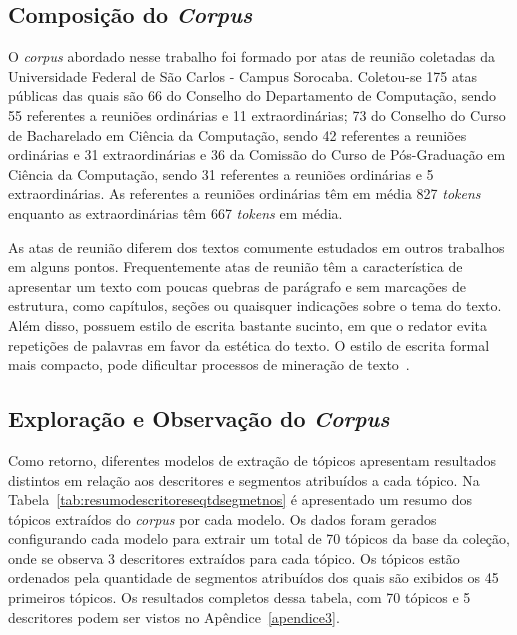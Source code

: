 \subsection{Composição do \textit{Corpus} }
\label{subsec:composicaocorpus}

O \textit{corpus} abordado nesse trabalho foi formado por atas de reunião coletadas da Universidade Federal de São Carlos - Campus Sorocaba. 
Coletou-se 175 atas públicas
das quais são 
66 do Conselho do Departamento de Computação, sendo 55 referentes a reuniões ordinárias e 11 extraordinárias;
73 do Conselho do Curso de Bacharelado em Ciência da Computação, sendo 42 referentes a reuniões ordinárias e 31 extraordinárias e
36 da Comissão do Curso de Pós-Graduação em Ciência da Computação, sendo 31 referentes a reuniões ordinárias e 5 extraordinárias.
As referentes a reuniões ordinárias têm em média 827 \textit{tokens} enquanto as extraordinárias têm 667 \textit{tokens} em média.

As atas de reunião diferem dos textos comumente estudados em outros trabalhos em alguns pontos. Frequentemente atas de reunião têm a característica de apresentar um texto com poucas quebras de parágrafo e sem marcações de estrutura, como capítulos, seções ou quaisquer indicações sobre o tema do texto. Além disso, possuem estilo de escrita bastante sucinto, em que o redator evita repetições de palavras em favor da estética do texto. O estilo de escrita formal mais compacto, pode dificultar processos de mineração de texto~\cite{Choi2001-LSA}.  %








\subsection{Exploração e Observação do \textit{Corpus}}

Como retorno, diferentes modelos de extração de tópicos apresentam resultados distintos em relação aos descritores e segmentos atribuídos a cada tópico. Na Tabela~\ref{tab:resumodescritoreseqtdsegmetnos} é apresentado um resumo dos tópicos extraídos do \textit{corpus} por cada modelo. Os dados foram gerados configurando cada modelo para extrair um total de 70 tópicos da base da coleção, onde se observa 3 descritores extraídos para cada tópico. Os tópicos estão ordenados pela quantidade de segmentos atribuídos dos quais são exibidos os 45 primeiros tópicos. Os resultados completos dessa tabela, com 70 tópicos e 5 descritores podem ser vistos no Apêndice~\ref{apendice3}.



